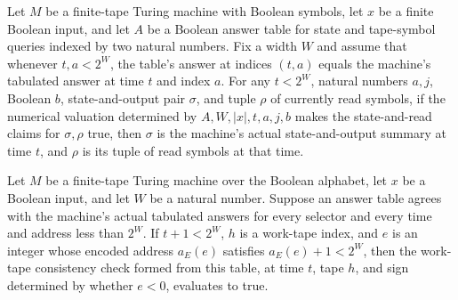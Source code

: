 \begin{theorem}
\label{Complexity.Meyer.claims_true}
\leanok
{}
Let $M$ be a finite-tape Turing machine with Boolean symbols, let $x$ be a finite
Boolean input, and let $A$ be a Boolean answer table for state and tape-symbol queries
indexed by two natural numbers. Fix a width $W$ and assume that whenever $t,a<2^W$, the
table's answer at indices $(t,a)$ equals the machine's tabulated answer at time $t$ and
index $a$. For any $t<2^W$, natural numbers $a,j$, Boolean $b$, state-and-output pair
$\sigma$, and tuple $\rho$ of currently read symbols, if the numerical valuation
determined by $A,W,|x|,t,a,j,b$ makes the state-and-read claims for $\sigma,\rho$ true,
then $\sigma$ is the machine's actual state-and-output summary at time $t$, and $\rho$
is its tuple of read symbols at that time.
\end{theorem}

\begin{theorem}
\label{Complexity.Meyer.workOK_true}
\leanok
{}
Let $M$ be a finite-tape Turing machine over the Boolean alphabet, let $x$ be a Boolean
input, and let $W$ be a natural number. Suppose an answer table agrees with the
machine's actual tabulated answers for every selector and every time and address less
than $2^W$. If $t+1<2^W$, $h$ is a work-tape index, and $e$ is an integer whose encoded
address $a_E(e)$ satisfies $a_E(e)+1<2^W$, then the work-tape consistency check formed
from this table, at time $t$, tape $h$, and sign determined by whether $e<0$, evaluates
to true.
\end{theorem}

